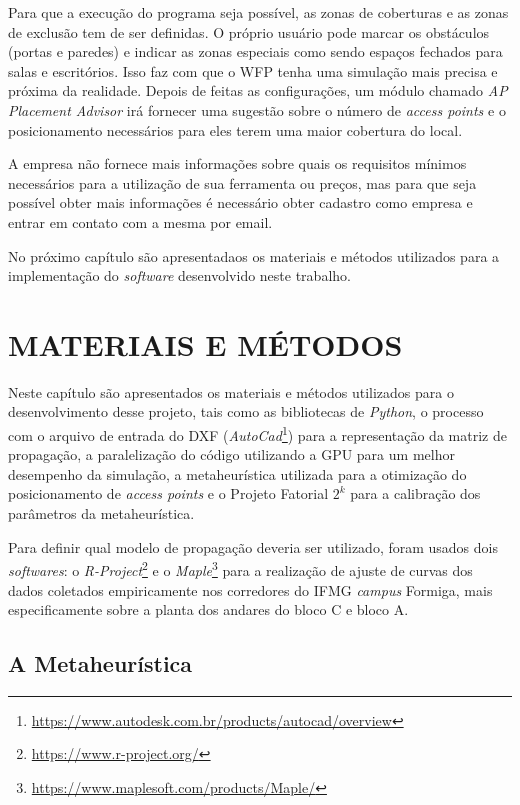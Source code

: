 \documentclass[
	12pt,				%
	twoside,			%
	a4paper,			%
	english,			%
	french,				%
	spanish,			%
	brazil				%
	]{abntex2}
\begin{document}
Para que a execução do programa seja possível, as zonas de coberturas e
as zonas de exclusão tem de ser definidas. O próprio usuário pode marcar
os obstáculos (portas e paredes) e indicar as zonas especiais como sendo
espaços fechados para salas e escritórios. Isso faz com que o WFP tenha
uma simulação mais precisa e próxima da realidade. Depois de feitas as
configurações, um módulo chamado \emph{AP Placement Advisor} irá
fornecer uma sugestão sobre o número de \emph{access points} e o
posicionamento necessários para eles terem uma maior cobertura do local.

A empresa não fornece mais informações sobre quais os requisitos mínimos
necessários para a utilização de sua ferramenta ou preços, mas para que
seja possível obter mais informações é necessário obter cadastro como
empresa e entrar em contato com a mesma por email.

No próximo capítulo são apresentadaos os materiais e métodos utilizados
para a implementação do \emph{software} desenvolvido neste trabalho.

\chapter{MATERIAIS E MÉTODOS}\label{sec:materiais}

Neste capítulo são apresentados os materiais e métodos utilizados para o
desenvolvimento desse projeto, tais como as bibliotecas de
\emph{Python}, o processo com o arquivo de entrada do DXF
(\emph{AutoCad}\footnote{\url{https://www.autodesk.com.br/products/autocad/overview}})
para a representação da matriz de propagação, a paralelização do código
utilizando a GPU para um melhor desempenho da simulação, a
metaheurística utilizada para a otimização do posicionamento de
\emph{access points} e o Projeto Fatorial \(2^{k}\) para a calibração
dos parâmetros da metaheurística.

Para definir qual modelo de propagação deveria ser utilizado, foram
usados dois \emph{softwares}: o \emph{R-Project}\footnote{\url{https://www.r-project.org/}}
e o \emph{Maple}\footnote{\url{https://www.maplesoft.com/products/Maple/}}
para a realização de ajuste de curvas dos dados coletados empiricamente
nos corredores do IFMG \emph{campus} Formiga, mais especificamente sobre
a planta dos andares do bloco C e bloco A.

\section{A Metaheurística}\label{a-metaheuruxedstica}
\end{document}
